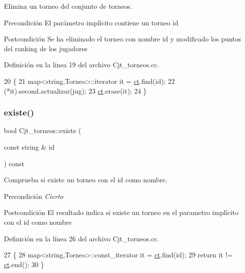 Elimina un torneo del conjunto de torneos. 

\begin{DoxyPrecond}{Precondición}
El parámetro implícito contiene un torneo id 
\end{DoxyPrecond}
\begin{DoxyPostcond}{Postcondición}
Se ha eliminado el torneo con nombre id y modificado los puntos del ranking de los jugadores 
\end{DoxyPostcond}


Definición en la línea 19 del archivo Cjt\+\_\+torneos.\+cc.


\begin{DoxyCode}
20 \{
21     map<string,Torneo>::iterator it = \hyperlink{class_cjt__torneos_a701df4fc4fbd2d6ffa081a01845083f3}{ct}.find(\textcolor{keywordtype}{id});
22     (*it).second.actualizar(jug);
23     \hyperlink{class_cjt__torneos_a701df4fc4fbd2d6ffa081a01845083f3}{ct}.erase(it);
24 \}
\end{DoxyCode}
\mbox{\label{class_cjt__torneos_ab7cf8c8a93172e3097e3e40c9bc55255}} 
\subsubsection{\texorpdfstring{existe()}{existe()}}
{\footnotesize\ttfamily bool Cjt\+\_\+torneos\+::existe (\begin{DoxyParamCaption}\item[{const string \&}]{id }\end{DoxyParamCaption}) const}



Comprueba si existe un torneo con el id como nombre. 

\begin{DoxyPrecond}{Precondición}
{\itshape Cierto} 
\end{DoxyPrecond}
\begin{DoxyPostcond}{Postcondición}
El resultado indica si existe un torneo en el parametro implícito con el id como nombre 
\end{DoxyPostcond}


Definición en la línea 26 del archivo Cjt\+\_\+torneos.\+cc.


\begin{DoxyCode}
27 \{
28     map<string,Torneo>::const\_iterator it = \hyperlink{class_cjt__torneos_a701df4fc4fbd2d6ffa081a01845083f3}{ct}.find(\textcolor{keywordtype}{id});
29     \textcolor{keywordflow}{return} it != \hyperlink{class_cjt__torneos_a701df4fc4fbd2d6ffa081a01845083f3}{ct}.end();
30 \}
\end{DoxyCode}
\mbox{\label{class_cjt__torneos_aba6d57df308bdbfa173578c108e19b82}} 
